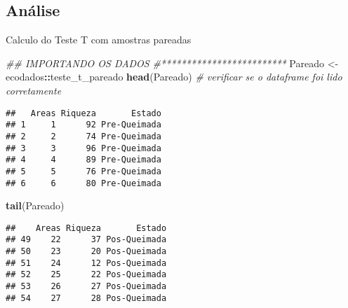 \documentclass[
]{book}
\newenvironment{Shaded}{\begin{snugshade}}{\end{snugshade}}
\newcommand{\CommentTok}[1]{\textcolor[rgb]{0.56,0.35,0.01}{\textit{#1}}}
\newcommand{\DataTypeTok}[1]{\textcolor[rgb]{0.13,0.29,0.53}{#1}}
\newcommand{\DecValTok}[1]{\textcolor[rgb]{0.00,0.00,0.81}{#1}}
\newcommand{\KeywordTok}[1]{\textcolor[rgb]{0.13,0.29,0.53}{\textbf{#1}}}
\newcommand{\NormalTok}[1]{#1}
\newcommand{\OperatorTok}[1]{\textcolor[rgb]{0.81,0.36,0.00}{\textbf{#1}}}
\newcommand{\OtherTok}[1]{\textcolor[rgb]{0.56,0.35,0.01}{#1}}
\newcommand{\StringTok}[1]{\textcolor[rgb]{0.31,0.60,0.02}{#1}}
\begin{document}
\hypertarget{anuxe1lise-2}{%
\subsection{Análise}\label{anuxe1lise-2}}

Calculo do Teste T com amostras pareadas

\begin{Shaded}
\begin{Highlighting}[]
\CommentTok{## IMPORTANDO OS DADOS}
\CommentTok{#*************************}
\NormalTok{Pareado <-}\StringTok{ }\NormalTok{ecodados}\OperatorTok{::}\NormalTok{teste_t_pareado}
\KeywordTok{head}\NormalTok{(Pareado) }\CommentTok{# verificar se o dataframe foi lido corretamente}
\end{Highlighting}
\end{Shaded}

\begin{verbatim}
##   Areas Riqueza       Estado
## 1     1      92 Pre-Queimada
## 2     2      74 Pre-Queimada
## 3     3      96 Pre-Queimada
## 4     4      89 Pre-Queimada
## 5     5      76 Pre-Queimada
## 6     6      80 Pre-Queimada
\end{verbatim}

\begin{Shaded}
\begin{Highlighting}[]
\KeywordTok{tail}\NormalTok{(Pareado)}
\end{Highlighting}
\end{Shaded}

\begin{verbatim}
##    Areas Riqueza       Estado
## 49    22      37 Pos-Queimada
## 50    23      20 Pos-Queimada
## 51    24      12 Pos-Queimada
## 52    25      22 Pos-Queimada
## 53    26      27 Pos-Queimada
## 54    27      28 Pos-Queimada
\end{verbatim}

\begin{Shaded}
\end{Shaded}
\end{document}
